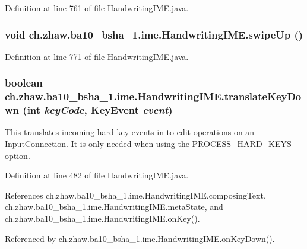 Definition at line 761 of file HandwritingIME.java.\hypertarget{classch_1_1zhaw_1_1ba10__bsha__1_1_1ime_1_1HandwritingIME_a76b1e0dc03f0b6d2641cf60325dee604}{
\subsubsection[{swipeUp}]{\setlength{\rightskip}{0pt plus 5cm}void ch.zhaw.ba10\_\-bsha\_\-1.ime.HandwritingIME.swipeUp ()}}
\label{classch_1_1zhaw_1_1ba10__bsha__1_1_1ime_1_1HandwritingIME_a76b1e0dc03f0b6d2641cf60325dee604}


Definition at line 771 of file HandwritingIME.java.\hypertarget{classch_1_1zhaw_1_1ba10__bsha__1_1_1ime_1_1HandwritingIME_a25b3410857b8a7b81ad09b2a76ca352c}{
\subsubsection[{translateKeyDown}]{\setlength{\rightskip}{0pt plus 5cm}boolean ch.zhaw.ba10\_\-bsha\_\-1.ime.HandwritingIME.translateKeyDown (int {\em keyCode}, \/  KeyEvent {\em event})}}
\label{classch_1_1zhaw_1_1ba10__bsha__1_1_1ime_1_1HandwritingIME_a25b3410857b8a7b81ad09b2a76ca352c}
This translates incoming hard key events in to edit operations on an \hyperlink{}{InputConnection}. It is only needed when using the PROCESS\_\-HARD\_\-KEYS option. 

Definition at line 482 of file HandwritingIME.java.

References ch.zhaw.ba10\_\-bsha\_\-1.ime.HandwritingIME.composingText, ch.zhaw.ba10\_\-bsha\_\-1.ime.HandwritingIME.metaState, and ch.zhaw.ba10\_\-bsha\_\-1.ime.HandwritingIME.onKey().

Referenced by ch.zhaw.ba10\_\-bsha\_\-1.ime.HandwritingIME.onKeyDown().

